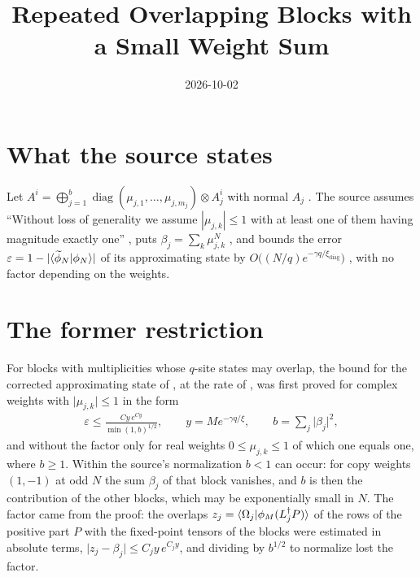 \documentclass{article}
\title{Repeated Overlapping Blocks with a Small Weight Sum}
\author{}
\date{2026-10-02}
\begin{document}
\maketitle
{}

\section{What the source states}
Let $A^i=\bigoplus_{j=1}^b\operatorname{diag}(\mu_{j,1},\dots,\mu_{j,m_j})
    \otimes A_j^i$ with normal $A_j$ \cite[eq.~(S2)]{Malz2024Preparation}. The source
assumes ``Without loss of generality we assume $| \mu_{j,k} | \le 1$ with at least one
of them having magnitude exactly one'' \cite[after eq.~(S2)]{Malz2024Preparation}, puts
$\beta_j=\sum_k\mu_{j,k}^N$ \cite[eq.~(S4)]{Malz2024Preparation}, and bounds the error
$\varepsilon=1-\lvert\langle \widetilde\phi_N | \phi_N \rangle\rvert$ of its approximating state
by $O\bigl((N/q)e^{-\gamma q/\xi_{\mathrm{diag}}}\bigr)$
\cite[Lemma~1$'$(ii)]{Malz2024Preparation}, with no factor depending on the weights.

\section{The former restriction}
For blocks with multiplicities whose $q$-site states may overlap, the bound for the corrected
approximating state of \cite{gap:mswc24_repeated_block_corrected_state}, at the rate of
\cite{gap:mswc24_block_form_mixed_overlap}, was first proved for complex weights with
$\lvert\mu_{j,k}\rvert\leq1$ in the form
\begin{align*}
    \varepsilon\leq\frac{Cy\,e^{Cy}}{\min(1,b)^{1/2}},\qquad y=Me^{-\gamma q/\xi},\qquad
    b=\sum_j\lvert\beta_j\rvert^2,
\end{align*}
and without the factor only for real weights $0\leq\mu_{j,k}\leq1$ of which one equals one,
where $b\geq1$. Within the source's normalization $b<1$ can occur: for copy weights $(1,-1)$
at odd $N$ the sum $\beta_j$ of that block vanishes, and $b$ is then the contribution of the
other blocks, which may be exponentially small in $N$. The factor came from the proof: the
overlaps $z_j=\langle \Omega_j | \phi_M(L_j^\dagger P) \rangle$ of the rows of the positive part $P$
with the fixed-point tensors of the blocks were estimated in absolute terms,
$\lvert z_j-\beta_j\rvert\leq C_jy\,e^{C_jy}$, and dividing by $b^{1/2}$ to normalize lost the
factor.
\end{document}
